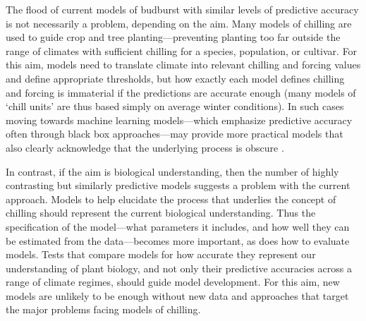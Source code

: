 \documentclass[11pt]{article}
\begin{document}
The flood of current models of budburst with similar levels of predictive accuracy is not necessarily a problem, depending on the aim. Many models of chilling are used to guide crop and tree planting---preventing planting too far outside the range of climates with sufficient chilling for a species, population, or cultivar. For this aim, models need to translate climate into relevant chilling and forcing values and define appropriate thresholds, but how exactly each model defines chilling and forcing is immaterial if the predictions are accurate enough (many models of `chill units' are thus based simply on average winter conditions). In such cases moving towards machine learning models---which emphasize predictive accuracy often through black box approaches---may provide more practical models that also clearly acknowledge that the underlying process is obscure \citep{khodadadzadeh,bauer2026rethinking}. 

In contrast, if the aim is biological understanding, then the number of highly contrasting but similarly predictive models suggests a problem with the current approach. Models to help elucidate the process that underlies the concept of chilling should represent the current biological understanding. Thus the specification of the model---what parameters it includes, and how well they can be estimated from the data---becomes more important, as does how to evaluate models. Tests that compare models for how accurate they represent our understanding of plant biology, and not only their predictive accuracies across a range of climate regimes, should guide model development. For this aim, new models are unlikely to be enough without new data and approaches that target the major problems facing models of chilling. %

\end{document}

